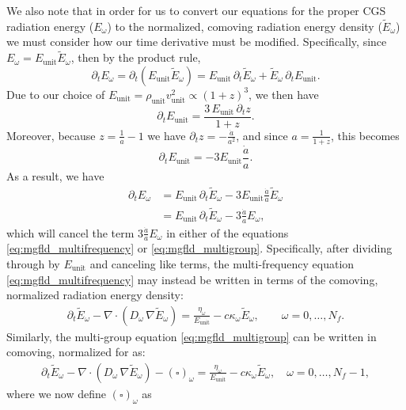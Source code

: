 \documentclass[10pt]{article}
\renewcommand{\(}{\left(}
\renewcommand{\)}{\right)}
\newcommand{\adot}{\dot{a}}
\newcommand{\Dunit}{\rho_{\text{unit}}}
\newcommand{\Vunit}{v_{\text{unit}}}
\newcommand{\Eunit}{E_{\text{unit}}}
\newcommand{\tE}{\tilde{E}}
\begin{document}
We also note that in order for us to convert our equations
for the proper CGS radiation energy ($E_{\omega}$) to the normalized,
comoving radiation energy density ($\tE_{\omega}$) we must consider how our
time derivative must be modified.  Specifically, since $E_{\omega} = \Eunit
\tE_{\omega}$, then by the product rule,
\[
   \partial_t E_{\omega} = \partial_t \left(\Eunit \tE_{\omega}\right) = 
   \Eunit\, \partial_t \tE_{\omega} + \tE_{\omega}\, \partial_t \Eunit.
\]
Due to our choice of $\Eunit = \Dunit \Vunit^2 \propto (1+z)^3$, we then have 
\[
   \partial_t \Eunit = \frac{3\, \Eunit\, \partial_t z}{1+z}.
\]
Moreover, because $z = \frac{1}{a}-1$ we have $\partial_t z =
-\frac{\adot}{a^2}$, and since $a = \frac{1}{1+z}$, this becomes 
\[
   \partial_t \Eunit = -3\Eunit\frac{\adot}{a}.
\]
As a result, we have 
\begin{align*}
   \partial_t E_{\omega} &= \Eunit\, \partial_t \tE_{\omega} - 3\Eunit \frac{\adot}{a} \tE_{\omega} \\
   &= \Eunit\, \partial_t \tE_{\omega} - 3\frac{\adot}{a} E_{\omega},
\end{align*}
which will cancel the term $3 \frac{\adot}{a} E_{\omega}$ in either of the
equations \eqref{eq:mgfld_multifrequency} or
\eqref{eq:mgfld_multigroup}.  Specifically, after dividing through by 
$\Eunit$ and canceling like terms, the multi-frequency equation
\eqref{eq:mgfld_multifrequency} may instead be written in terms of the
comoving, normalized radiation energy density: 
\begin{align}
  \label{eq:mgfld_multifrequency_Ecomoving}
  \partial_{t} \tE_{\omega} - \nabla\cdot(D_{\omega}\,\nabla \tE_{\omega}) 
    = \frac{\eta_{\omega}}{\Eunit} - c \kappa_{\omega} \tE_{\omega}, \qquad \omega=0,\ldots,N_f.
\end{align}
Similarly, the multi-group equation \eqref{eq:mgfld_multigroup} can be
written in comoving, normalized for as:
\begin{align}
  \label{eq:mgfld_multigroup_Ecomoving}
  \partial_{t} \tE_{\omega} - \nabla\cdot(D_{\omega}\,\nabla \tE_{\omega}) -
    (\square)_{\omega} = \frac{\eta_{\omega}}{\Eunit} - c\kappa_{\omega} \tE_{\omega},
    \quad \omega=0,\ldots,N_f-1,
\end{align}
where we now define $(\square)_{\omega}$ as 
\end{document}
